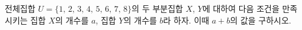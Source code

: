 전체집합 $U=\{1,\,2,\,3,\,4,\,5,\,6,\,7,\,8\}$의 두 부분집합 $X$, $Y$에 대하여 다음 조건을 만족시키는 집합 $X$의 개수를 $a$, 집합 $Y$의 개수를 $b$라 하자. 이때 $a+b$의 값을 구하시오. 
